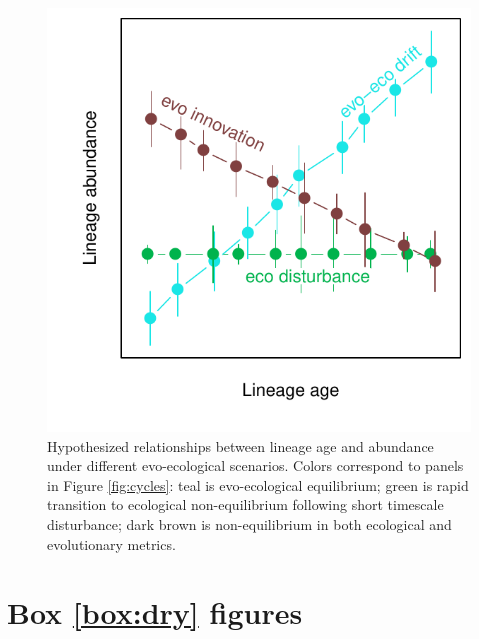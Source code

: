 \documentclass[12pt]{article}
\newcounter{Box}
\providecommand{\DIFdelend}{} %
\begin{document}
\DIFdelend %
\begin{figure}[!hbp]
  \centering
  \includegraphics[scale=1]{fig_age-abund.pdf}
  \caption{Hypothesized relationships between lineage age and
    abundance under different evo-ecological scenarios. Colors
    correspond to panels in Figure \ref{fig:cycles}: teal is
    evo-ecological equilibrium; green is rapid transition to
    ecological non-equilibrium following short timescale disturbance;
    dark brown is non-equilibrium in both ecological and evolutionary
    metrics.}
  \label{fig:age-abund}
\end{figure}

\pagebreak

\section*{Box \ref{box:dry} figures}

\setcounter{figure}{0}
\renewcommand{\thefigure}{\Roman{figure}}
\end{document}
